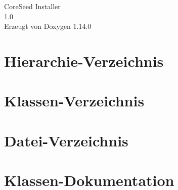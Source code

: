\documentclass[twoside]{book}
\newcommand{\+}{\discretionary{\mbox{\scriptsize$\hookleftarrow$}}{}{}}
\newcommand{\clearemptydoublepage}{%
    \newpage{\pagestyle{empty}\cleardoublepage}%
  }
\begin{document}
  \raggedbottom
    \hypersetup{pageanchor=false,
                bookmarksnumbered=true,
                pdfencoding=unicode
               }
  \begin{titlepage}
  \vspace*{7cm}
  \begin{center}%
  {\Large Core\+Seed Installer}\\
  [1ex]\large 1.\+0 \\
  \vspace*{1cm}
  {\large Erzeugt von Doxygen 1.14.0}\\
  \end{center}
  \end{titlepage}
  \clearemptydoublepage
  \tableofcontents
  \clearemptydoublepage
  \hypersetup{pageanchor=true}
\chapter{Hierarchie-\/\+Verzeichnis}

\chapter{Klassen-\/\+Verzeichnis}

\chapter{Datei-\/\+Verzeichnis}

\chapter{Klassen-\/\+Dokumentation}














\end{document}

